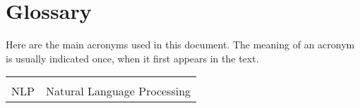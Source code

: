 \chapter*{Glossary}

Here are the main acronyms used in this document. The meaning of an acronym is usually indicated once, when it first appears in the text.

\begin{longtable}{lp{9cm}}
        &                             \\
    NLP & Natural Language Processing \\
\end{longtable}
